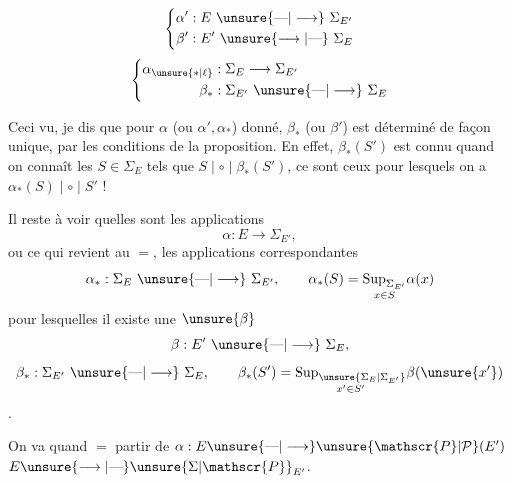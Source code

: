 
\[
\left\{\begin{aligned}
\alpha' &: E\ \unsure{\text{---}|\longrightarrow}\ \Sigma_{E'}\\
\beta' &: E'\ \unsure{\longrightarrow|\text{---}}\ \Sigma_E
\end{aligned}\right.
\]
\[
\left\{\begin{aligned}
\alpha_{\unsure{*|\ell}} &: \Sigma_E\longrightarrow\Sigma_{E'}\\
\beta_* &: \Sigma_{E'}\ \unsure{\text{---}|\longrightarrow}\ \Sigma_E
\end{aligned}\right.
\]

Ceci vu, je dis que  pour $\alpha$ (ou $\alpha',\alpha_*$) donné, $\beta_*$ (ou $\beta'$) est déterminé de façon unique, par les conditions de la proposition. En effet, $\beta_*(S')$ est connu quand on connaît les $S\in\Sigma_E$ tels que $S\mid\circ\mid\beta_*(S')$, ce sont ceux pour lesquels on a $\alpha_*(S)\mid\circ\mid S'$ !


Il reste à voir quelles sont les applications
\[
\alpha:E\longrightarrow\Sigma_{E'},
\]
ou ce qui revient au $=$, les applications correspondantes
\[
\alpha_*:\Sigma_E\ \unsure{\text{---}|\longrightarrow}\ \Sigma_{E'},\qquad \alpha_*(S)=\underset{x\in S}{\operatorname{Sup}_{\Sigma_{E'}}}\alpha(x)
\]
pour lesquelles il existe une $\unsure{\beta}$
\[
\beta:E'\ \unsure{\text{---}|\longrightarrow}\ \Sigma_E,
\]
\[
\beta_*:\Sigma_{E'}\ \unsure{\text{---}|\longrightarrow}\ \Sigma_E,\qquad \beta_*(S')=\underset{x'\in S'}{\operatorname{Sup}_{\unsure{\Sigma_E|\Sigma_{E'}}}}\beta(\unsure{x'})
\]
.

On va quand $=$ partir de $\alpha:E\unsure{\text{---}|\longrightarrow}\unsure{\mathscr{P}|\mathcal{P}}(E')$  $E\unsure{\longrightarrow|\text{---}}\unsure{\Sigma|\mathscr{P}}_{E'}$.
